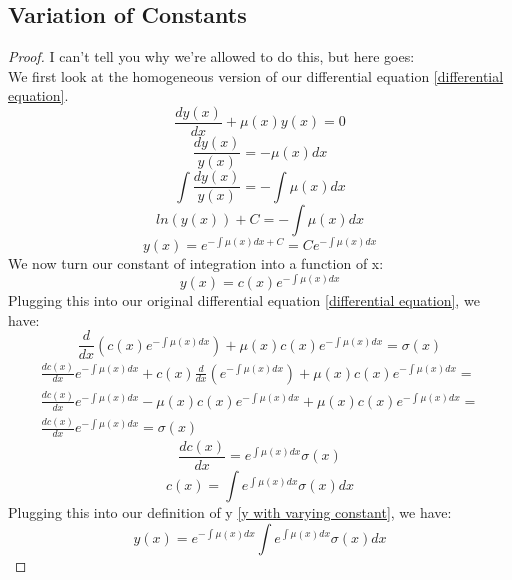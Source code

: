 \documentclass{article}
\begin{document}
    \subsection{Variation of Constants}
    \begin{proof}
        I can't tell you why we're allowed to do this, but here goes:\\
        We first look at the homogeneous version of our differential equation \ref{differential equation}.
        \[ \frac{dy(x)}{dx}+\mu(x)y(x) = 0 \]
        \[ \frac{dy(x)}{y(x)} = -\mu(x)dx \]
        \[ \int \frac{dy(x)}{y(x)} = -\int \mu(x)dx \]
        \[ ln(y(x)) + C = -\int \mu(x)dx \]
        \[ y(x) = e^{-\int \mu(x)dx + C} = Ce^{-\int \mu(x)dx} \]
        We now turn our constant of integration into a function of x:
        \begin{equation} \label{y with varying constant}
            y(x) = c(x)e^{-\int \mu(x)dx}
        \end{equation}
        Plugging this into our original differential equation \ref{differential equation}, we have:
        \[ \frac{d}{dx}(c(x)e^{-\int \mu(x)dx}) + \mu(x)c(x)e^{-\int \mu(x)dx} = \sigma(x) \]
        \begin{equation*}
        \begin{split}
            \frac{dc(x)}{dx}e^{-\int \mu(x)dx} + c(x)\frac{d}{dx}(e^{-\int \mu(x)dx}) + \mu(x)c(x)e^{-\int \mu(x)dx} =\\
            \frac{dc(x)}{dx}e^{-\int \mu(x)dx} - \mu(x)c(x)e^{-\int \mu(x)dx} + \mu(x)c(x)e^{-\int \mu(x)dx} =\\
            \frac{dc(x)}{dx}e^{-\int \mu(x)dx} = \sigma(x)
        \end{split}
        \end{equation*}
        \[ \frac{dc(x)}{dx} = e^{\int \mu(x)dx}\sigma(x) \]
        \[ c(x) = \int e^{\int \mu(x)dx}\sigma(x) dx \]
        Plugging this into our definition of y \ref{y with varying constant}, we have:
        \[ y(x) = e^{-\int \mu(x)dx} \int e^{\int \mu(x)dx}\sigma(x)dx \]
    \end{proof}
\end{document}
